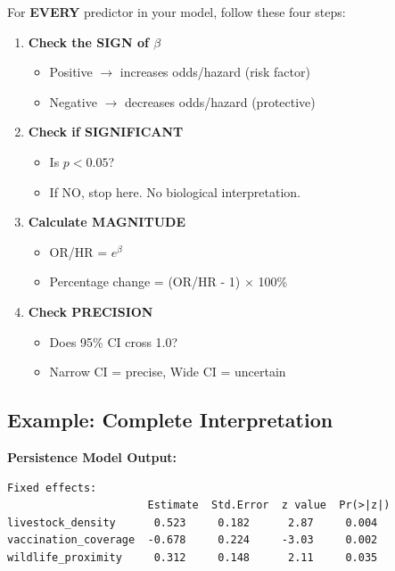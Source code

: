 \documentclass[11pt,a4paper]{article}
\begin{document}
For \textbf{EVERY} predictor in your model, follow these four steps:

\begin{enumerate}[leftmargin=*]
    \item \textbf{Check the SIGN of $\beta$}
    \begin{itemize}
        \item Positive $\rightarrow$ increases odds/hazard (risk factor)
        \item Negative $\rightarrow$ decreases odds/hazard (protective)
    \end{itemize}
    
    \item \textbf{Check if SIGNIFICANT}
    \begin{itemize}
        \item Is $p < 0.05$?
        \item If NO, stop here. No biological interpretation.
    \end{itemize}
    
    \item \textbf{Calculate MAGNITUDE}
    \begin{itemize}
        \item OR/HR = $e^{\beta}$
        \item Percentage change = (OR/HR - 1) $\times$ 100\%
    \end{itemize}
    
    \item \textbf{Check PRECISION}
    \begin{itemize}
        \item Does 95\% CI cross 1.0?
        \item Narrow CI = precise, Wide CI = uncertain
    \end{itemize}
\end{enumerate}

\subsection{Example: Complete Interpretation}

\textbf{Persistence Model Output:}
\begin{verbatim}
Fixed effects:
                      Estimate  Std.Error  z value  Pr(>|z|)
livestock_density      0.523     0.182      2.87     0.004
vaccination_coverage  -0.678     0.224     -3.03     0.002
wildlife_proximity     0.312     0.148      2.11     0.035
\end{verbatim}
\end{document}
